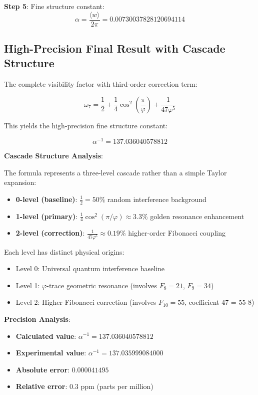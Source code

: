 \documentclass[%
 reprint,
 amsmath,amssymb,
 aps,
 prd,
 10pt,
 nofootinbib,      %
 longbibliography  %
]{revtex4-2}
\theoremstyle{definition}
\theoremstyle{remark}
\begin{document}
\textbf{Step 5}: Fine structure constant:
\begin{equation}
\alpha = \frac{\langle w \rangle}{2\pi} = 0.00730037828120694114
\end{equation}

\subsection{High-Precision Final Result with Cascade Structure}

The complete visibility factor with third-order correction term:

\begin{equation}
\boxed{\omega_7 = \frac{1}{2} + \frac{1}{4}\cos^2\left(\frac{\pi}{\varphi}\right) + \frac{1}{47\varphi^5}}
\end{equation}

This yields the high-precision fine structure constant:

\begin{equation}
\boxed{\alpha^{-1} = 137.036040578812}
\end{equation}

\textbf{Cascade Structure Analysis}:

The formula represents a three-level cascade rather than a simple Taylor expansion:

\begin{itemize}
\item \textbf{0-level (baseline)}: $\frac{1}{2} = 50\%$ random interference background
\item \textbf{1-level (primary)}: $\frac{1}{4}\cos^2(\pi/\varphi) \approx 3.3\%$ golden resonance enhancement
\item \textbf{2-level (correction)}: $\frac{1}{47\varphi^5} \approx 0.19\%$ higher-order Fibonacci coupling
\end{itemize}

Each level has distinct physical origins:
\begin{itemize}
\item Level 0: Universal quantum interference baseline
\item Level 1: $\varphi$-trace geometric resonance (involves $F_8 = 21$, $F_9 = 34$)
\item Level 2: Higher Fibonacci correction (involves $F_{10} = 55$, coefficient 47 = 55-8)
\end{itemize}

\textbf{Precision Analysis}:
\begin{itemize}
\item \textbf{Calculated value}: $\alpha^{-1} = 137.036040578812$
\item \textbf{Experimental value}: $\alpha^{-1} = 137.035999084000$
\item \textbf{Absolute error}: $0.000041495$
\item \textbf{Relative error}: $0.3$ ppm (parts per million)
\end{itemize}
\end{document}
